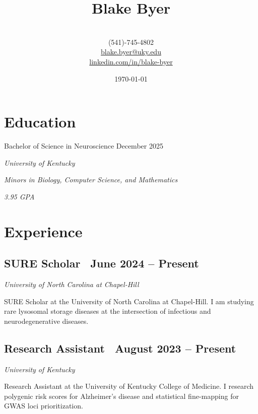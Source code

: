 \documentclass{article}
\begin{document}
\title{\Huge \textbf{Blake Byer} \vspace{-1.25em}}

\author{\\
    (541)-745-4802 \\
    \href{mailto:blake.byer@uky.edu}{blake.byer@uky.edu} \\
    \href{https://linkedin.com/in/blake-byer}{linkedin.com/in/blake-byer}
}
\date{\today}
\maketitle

\begin{flushleft}

\section*{Education}

{\large Bachelor of Science in Neuroscience \vspace{0.5em}}\hfill December 2025

\textit{University of Kentucky}

\textit{Minors in Biology, Computer Science, and Mathematics}

\textit{3.95 GPA}

\section*{Experience}

\subsection*{SURE Scholar {\hfill\normalsize\normalfont\ June 2024 -- Present}}
\textit{University of North Carolina at Chapel-Hill \vspace{0.5em}}

SURE Scholar at the University of North Carolina at Chapel-Hill. I am studying rare lysosomal storage diseases
at the intersection of infectious and neurodegenerative diseases.

\subsection*{Research Assistant {\hfill\normalsize\normalfont\ August 2023 -- Present}}
\textit{University of Kentucky \vspace{0.5em}}

Research Assistant at the University of Kentucky College of Medicine. I research polygenic risk scores for 
Alzheimer's disease and statistical fine-mapping for GWAS loci prioritization.


\end{flushleft}
\end{document}
